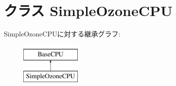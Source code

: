 \hypertarget{classSimpleOzoneCPU_1_1SimpleOzoneCPU}{
\section{クラス SimpleOzoneCPU}
\label{classSimpleOzoneCPU_1_1SimpleOzoneCPU}
}
SimpleOzoneCPUに対する継承グラフ:\begin{figure}[H]
\begin{center}
\leavevmode
\includegraphics[height=2cm]{classSimpleOzoneCPU_1_1SimpleOzoneCPU}
\end{center}
\end{figure}
